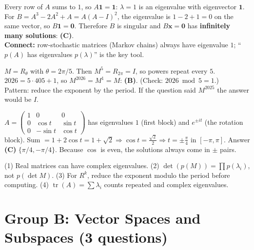 \documentclass[11pt,a4paper]{article}
\newcommand{\tr}{\operatorname{tr}}
\begin{document}
\begin{example}
Every row of $A$ sums to $1$, so $A\mathbf1=\mathbf1$: $\lambda=1$ is an eigenvalue with eigenvector $\mathbf1$. For $B=A^3-2A^2+A=A(A-I)^2$, the eigenvalue is $1-2+1=0$ on the same vector, so $B\mathbf1=\mathbf0$. Therefore $B$ is singular and $B\mathbf x=\mathbf0$ has \textbf{infinitely many solutions}: \textbf{(C)}.\\
\textbf{Connect:} row-stochastic matrices (Markov chains) always have eigenvalue $1$; ``$p(A)$ has eigenvalues $p(\lambda)$'' is the key tool.
\end{example}

\begin{example}
$M=R_\theta$ with $\theta=2\pi/5$. Then $M^5=R_{2\pi}=I$, so powers repeat every $5$. $2026=5\cdot405+1$, so $M^{2026}=M^1=M$: \textbf{(B)}. (Check: $2026\bmod5=1$.)\\
Pattern: reduce the exponent by the period. If the question said $M^{2025}$ the answer would be $I$.
\end{example}

\begin{example}
$A=\begin{pmatrix}1&0&0\\0&\cos t&\sin t\\0&-\sin t&\cos t\end{pmatrix}$ has eigenvalues $1$ (first block) and $e^{\pm it}$ (the rotation block). Sum $=1+2\cos t=1+\sqrt2\Rightarrow\cos t=\frac{\sqrt2}2\Rightarrow t=\pm\frac\pi4$ in $[-\pi,\pi]$. Answer \textbf{(C)} $\{\pi/4,-\pi/4\}$. Because $\cos$ is even, the solutions always come in $\pm$ pairs.
\end{example}

\begin{trap}
(1) Real matrices can have complex eigenvalues. (2) $\det(p(M))=\prod p(\lambda_i)$, not $p(\det M)$. (3) For $R^k$, reduce the exponent modulo the period before computing. (4) $\tr(A)=\sum\lambda_i$ counts repeated and complex eigenvalues.
\end{trap}

\section{Group B: Vector Spaces and Subspaces (3 questions)}
\end{document}
